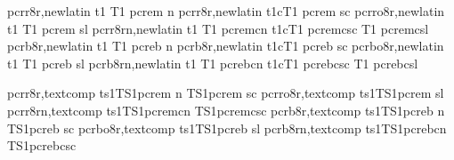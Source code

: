 

  {}
 {}
  {}
 {}

 {}
 {}

\installfonts
{}
  {pcrr8r,newlatin}  {t1} {T1} {pcre}{m} {n} {}
 {pcrr8r,newlatin}  {t1c}{T1} {pcre}{m} {sc}{}
 {pcrro8r,newlatin} {t1} {T1} {pcre}{m} {sl}{}
 {pcrr8rn,newlatin} {t1} {T1} {pcre}{mc}{n} {}
 {t1c}{T1} {pcre}{mc}{sc}{}
 {T1} {pcre}{mc}{sl}{}
  {pcrb8r,newlatin}  {t1} {T1} {pcre}{b} {n} {}
 {pcrb8r,newlatin}  {t1c}{T1} {pcre}{b} {sc}{}
 {pcrbo8r,newlatin} {t1} {T1} {pcre}{b} {sl}{}
 {pcrb8rn,newlatin} {t1} {T1} {pcre}{bc}{n} {}
 {t1c}{T1} {pcre}{bc}{sc}{}
 {T1} {pcre}{bc}{sl}{}
\endinstallfonts

\installfonts
{}
  {pcrr8r,textcomp}  {ts1}{TS1}{pcre}{m} {n} {}
                          {TS1}{pcre}{m} {sc}{}
 {pcrro8r,textcomp} {ts1}{TS1}{pcre}{m} {sl}{}
 {pcrr8rn,textcomp} {ts1}{TS1}{pcre}{mc}{n} {}
                         {TS1}{pcre}{mc}{sc}{}
  {pcrb8r,textcomp}  {ts1}{TS1}{pcre}{b} {n} {}
                          {TS1}{pcre}{b} {sc}{}
 {pcrbo8r,textcomp} {ts1}{TS1}{pcre}{b} {sl}{}
 {pcrb8rn,textcomp} {ts1}{TS1}{pcre}{bc}{n} {}
                         {TS1}{pcre}{bc}{sc}{}
\endinstallfonts

\bye
